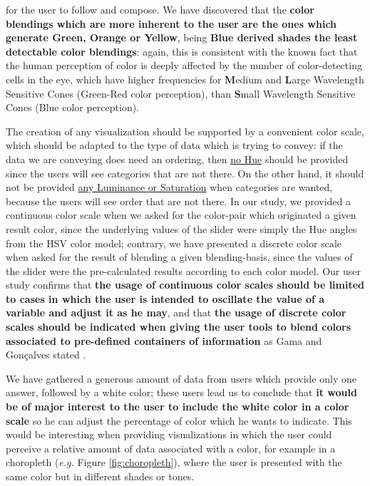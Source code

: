 for the user to follow and compose. We have discovered that the \textbf{color blendings which are more inherent to the user are the ones which
generate Green, Orange or Yellow}, being \textbf{Blue derived shades the least detectable color blendings}: again, this is consistent with the known
fact that the human perception of color is deeply affected by the number of color-detecting cells in the eye, which have higher frequencies for
\textbf{M}edium and \textbf{L}arge Wavelength Sensitive Cones (Green-Red color perception), than \textbf{S}mall Wavelength Sensitive Cones
(Blue color perception). \par
%
The creation of any visualization should be supported by a convenient color scale, which should be adapted to the type of data which is trying to
convey: if the data we are conveying does need an ordering, then \ul{no Hue} should be provided since the users will see categories that are not there.
On the other hand, it should not be provided \ul{any Luminance or Saturation} when categories are wanted, because the users will see order that are not
there. In our study, we provided a continuous color scale when we asked for the color-pair which originated a given result color, since the underlying
values of the slider were simply the Hue angles from the HSV color model; contrary, we have presented a discrete color scale when asked for the result
of blending a given blending-basis, since the values of the slider were the pre-calculated results according to each color model. Our user study confirms
that \textbf{the usage of continuous color scales should be limited to cases in which the user is intended to oscillate the value of a variable and adjust
it as he may}, and that \textbf{the usage of discrete color scales should be indicated when giving the user tools to blend colors associated to
pre-defined containers of information} as Gama and Gonçalves stated \cite{Gama20142}.\par
%
We have gathered a generous amount of data from users which provide only one answer, followed by a white color; these users lead us to conclude that
\textbf{it would be of major interest to the user to include the white color in a color scale} so he can adjust the percentage of color which he wants
to indicate. This would be interesting when providing visualizations in which the user could perceive a relative amount of data associated with a color,
for example in a choropleth (\emph{e.g.} Figure \ref{fig:choropleth}), where the user is presented with the same color but in different shades or tones. \par
